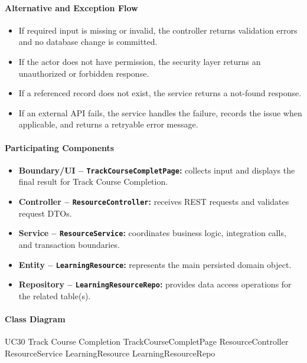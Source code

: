 \paragraph{Alternative and Exception Flow}

\begin{itemize}
    \item If required input is missing or invalid, the controller returns validation errors and no database change is committed.
    \item If the actor does not have permission, the security layer returns an unauthorized or forbidden response.
    \item If a referenced record does not exist, the service returns a not-found response.
    \item If an external API fails, the service handles the failure, records the issue when applicable, and returns a retryable error message.
\end{itemize}

\paragraph{Participating Components}

\begin{itemize}
    \item \textbf{Boundary/UI -- \texttt{TrackCourseCompletPage}:} collects input and displays the final result for Track Course Completion.
    \item \textbf{Controller -- \texttt{ResourceController}:} receives REST requests and validates request DTOs.
    \item \textbf{Service -- \texttt{ResourceService}:} coordinates business logic, integration calls, and transaction boundaries.
    \item \textbf{Entity -- \texttt{LearningResource}:} represents the main persisted domain object.
    \item \textbf{Repository -- \texttt{LearningResourceRepo}:} provides data access operations for the related table(s).
\end{itemize}

\paragraph{Class Diagram}

\ClassDiagram
{UC30 Track Course Completion}
{TrackCourseCompletPage}
{ResourceController}
{ResourceService}
{LearningResource}
{LearningResourceRepo}

